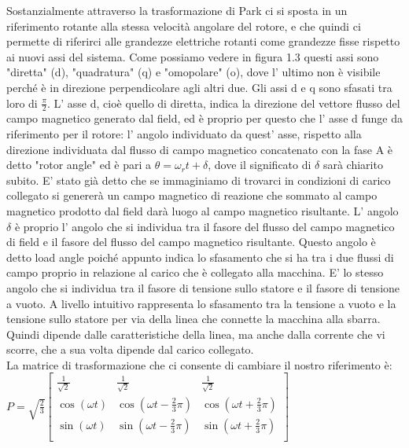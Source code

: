 \documentclass[Lau,noexaminfo]{sapthesis}
\begin{document}
	Sostanzialmente attraverso la trasformazione di Park ci si sposta in un riferimento rotante alla stessa velocità angolare del rotore, e che quindi ci permette di riferirci alle grandezze elettriche rotanti come grandezze fisse rispetto ai nuovi assi del sistema. Come possiamo vedere in figura 1.3 questi assi sono "diretta" (d), "quadratura" (q) e "omopolare" (o), dove l' ultimo non è visibile perché è in direzione perpendicolare agli altri due. Gli assi d e q sono sfasati tra loro di $\frac{\pi}{2}$. L' asse d, cioè quello di diretta, indica la direzione del vettore flusso del campo magnetico generato dal field, ed è proprio per questo che l' asse d funge da riferimento per il rotore: l' angolo individuato da quest' asse, rispetto alla direzione individuata dal flusso di campo magnetico concatenato con la fase A è detto "rotor angle" ed è pari a $\theta=\omega_r t+\delta $, dove il significato di $\delta$ sarà chiarito subito. E' stato già detto che se immaginiamo di trovarci in condizioni di carico collegato si genererà un campo magnetico di reazione che sommato al campo magnetico prodotto dal field darà luogo al campo magnetico risultante. L' angolo $\delta$ è proprio l' angolo che si individua tra il fasore del flusso del campo magnetico di field e il fasore del flusso del campo magnetico risultante. Questo angolo è detto load angle poiché appunto indica lo sfasamento che si ha tra i due flussi di campo proprio in relazione al carico che è collegato alla macchina. E' lo stesso angolo che si individua tra il fasore di tensione sullo statore e il fasore di tensione a vuoto. A livello intuitivo rappresenta lo sfasamento tra la tensione a vuoto e la tensione sullo statore per via della linea che connette la macchina alla sbarra. Quindi dipende dalle caratteristiche della linea, ma anche dalla corrente che vi scorre, che a sua volta dipende dal carico collegato.\\
	La matrice di trasformazione che ci consente di cambiare il nostro riferimento è:\\
	$P=\sqrt{\frac{2}{3}}\begin{bmatrix}
		\frac{1}{\sqrt2} & \frac{1}{\sqrt2} & \frac{1}{\sqrt2} \\
		\cos(\omega t) & \cos(\omega t -\frac{2}{3}\pi) & \cos(\omega t +\frac{2}{3}\pi) \\
		\sin(\omega t) & \sin(\omega t -\frac{2}{3}\pi) & \sin(\omega t +\frac{2}{3}\pi) \\
		
	\end{bmatrix}$\\
\end{document}
